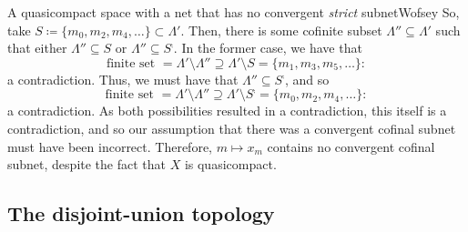 \begin{exm}{A quasicompact space with a net that has no convergent \emph{strict} subnet}{Wofsey}
So, take $S\coloneqq \{ m_0,m_2,m_4,\ldots \} \subset \Lambda '$.  Then, there is some cofinite subset $\Lambda ''\subseteq \Lambda '$ such that either $\Lambda ''\subseteq S$ or $\Lambda ''\subseteq S^{\comp}$.  In the former case, we have that
\begin{equation}
\text{finite set }=\Lambda '\setminus \Lambda '' \supseteq \Lambda '\setminus S=\{ m_1,m_3,m_5,\ldots \} :
\end{equation}
a contradiction.  Thus, we must have that $\Lambda ''\subseteq S^{\comp}$, and so
\begin{equation}
\text{finite set }=\Lambda '\setminus \Lambda ''\supseteq \Lambda '\setminus S^{\comp}=\{ m_0,m_2,m_4,\ldots \} :
\end{equation}
a contradiction.  As both possibilities resulted in a contradiction, this itself is a contradiction, and so our assumption that there was a convergent cofinal subnet must have been incorrect.  Therefore, $m\mapsto x_m$ contains no convergent cofinal subnet, despite the fact that $X$ is quasicompact.
\end{exm}

\subsection{The disjoint-union topology}

